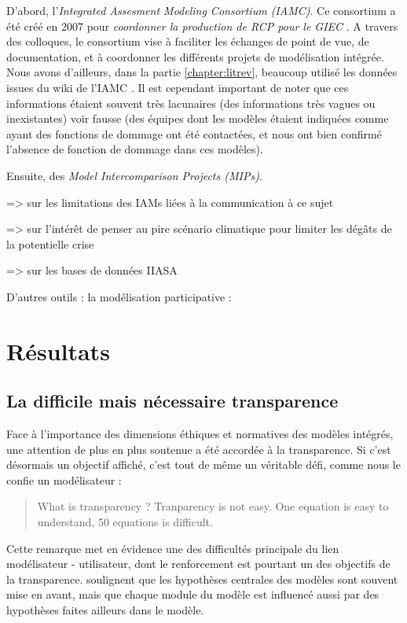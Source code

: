 D'abord, l'\emph{Integrated Assesment Modeling Consortium (IAMC)}. Ce consortium a été créé en 2007 pour \emph{coordonner la production de RCP pour le GIEC} \cite{cointe_organising_2019}. A travers des colloques, le consortium vise à faciliter les échanges de point de vue, de documentation, et à coordonner les différents projets de modélisation intégrée. Nous avons d'ailleurs, dans la partie \ref{chapter:litrev}, beaucoup utilisé les données issues du wiki de l'IAMC \cite{noauthor_models_nodate}. Il est cependant important de noter que ces informations étaient souvent très lacunaires (des informations très vagues ou inexistantes) voir fausse (des équipes dont les modèles étaient indiquées comme ayant des fonctions de dommage ont été contactées, et nous ont bien confirmé l'absence de fonction de dommage dans ces modèles). 

Ensuite, des \emph{Model Intercomparison Projects (MIPs)}.


\cite{keppo_exploring_2021} => sur les limitations des IAMs liées à la communication à ce sujet

\cite{davidson_climate_nodate} => sur l'intérêt de penser au pire scénario climatique pour limiter les dégâts de la potentielle crise


\cite{dekker_consensus_2022} => sur les bases de données IIASA
  
D'autres outils : la modélisation participative : 
\cite{etienne_modelisation_2010}






\section{Résultats}

\subsection{La difficile mais nécessaire transparence}

Face à l'importance des dimensions éthiques et normatives des modèles intégrés, une attention de plus en plus soutenue a été accordée à la transparence.  Si c'est désormais un objectif affiché, c'est tout de même un véritable défi, comme nous le confie un modélisateur : 

\begin{quote}
    What is transparency ? Tranparency is not easy. One equation is easy to understand, 50 equations is difficult. 
\end{quote}
Cette remarque met en évidence une des difficultés principale du lien modélisateur - utilisateur, dont le renforcement est pourtant un des objectifs de la transparence. \cite{keppo_exploring_2021} soulignent que les hypothèses centrales des modèles sont souvent mise en avant, mais que chaque module du modèle est influencé  aussi par des hypothèses faites ailleurs dans le modèle. \\

